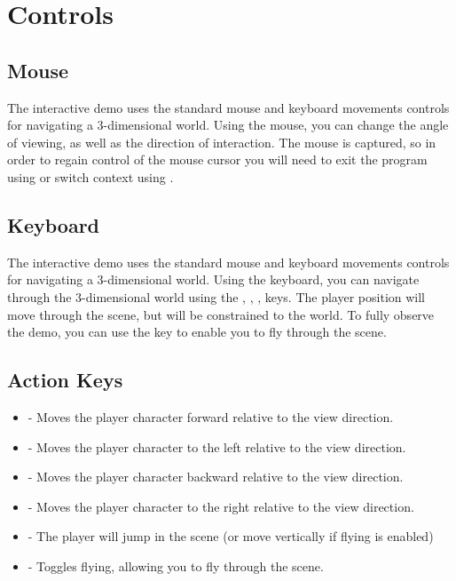 \documentclass{book}
\begin{document}
\section{Controls}
\subsection{Mouse}
The interactive demo uses the standard mouse and keyboard movements controls for navigating a 3-dimensional world.  Using the mouse, you can change the angle of viewing, as well as the direction of interaction.  The mouse is captured, so in order to regain control of the mouse cursor you will need to exit the program using  or switch context using .

\subsection{Keyboard}
The interactive demo uses the standard mouse and keyboard movements controls for navigating a 3-dimensional world.   Using the keyboard, you can navigate through the 3-dimensional world using the , , ,  keys.  The player position will move through the scene, but will be constrained to the world.  To fully observe the demo, you can use the  key to enable you to fly through the scene. 

\subsection{Action Keys}
\begin{itemize}
	\item {} - Moves the player character forward relative to the view direction.
	\item {} - Moves the player character to the left relative to the view direction.
	\item {} - Moves the player character backward relative to the view direction.
	\item {} - Moves the player character to the right relative to the view direction.
	\item {} - The player will jump in the scene (or move vertically if flying is enabled)
	\item {} - Toggles flying, allowing you to fly through the scene.
\end{itemize}
      
\end{document}
